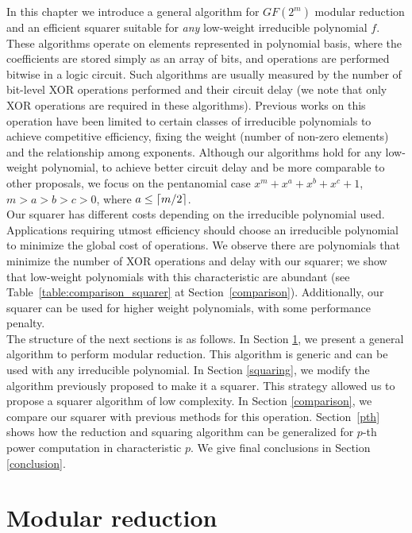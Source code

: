 In this chapter we introduce a general algorithm for $GF(2^m)$ modular reduction and an efficient squarer suitable for \emph{any} low-weight irreducible polynomial $f$. These algorithms operate on elements represented in polynomial basis, where the coefficients are stored simply as an array of bits, and operations are performed bitwise in a logic circuit. Such algorithms are usually measured by the number of bit-level XOR operations performed and their circuit delay (we note that only XOR operations are required in these algorithms). Previous works on this operation have been limited to certain classes of irreducible polynomials to achieve competitive efficiency, fixing the weight (number of non-zero elements) and the relationship among exponents. 
Although our algorithms hold for any low-weight polynomial, to achieve better circuit delay and be more comparable to other proposals, we focus on the pentanomial case $x^m+x^a+x^b+x^c+1$, $m > a > b > c > 0$, where $a \leq \lceil m/2\rceil$.\\

Our squarer has different costs depending on the irreducible polynomial used. Applications requiring utmost efficiency should choose an irreducible polynomial to minimize the global cost of operations. We observe there are polynomials that minimize the number of XOR operations and delay with our squarer; we show that low-weight polynomials with this characteristic are abundant (see Table~\ref{table:comparison_squarer} at Section~\ref{comparison}). Additionally, our squarer can be used for higher weight polynomials, with some performance penalty.\\

The structure of the next sections is as follows. In Section \ref{modrec}, we present a general algorithm to perform modular reduction. This algorithm is generic and can be used with any irreducible polynomial. In Section \ref{squaring}, we modify the algorithm previously proposed to make it a squarer. This strategy allowed us to propose a squarer algorithm of low complexity. In Section \ref{comparison}, we compare our squarer with previous methods for this operation. Section~\ref{pth} shows how the reduction and squaring algorithm can be generalized for $p$-th power computation in characteristic $p$. We give final conclusions in Section \ref{conclusion}. \\

\section{Modular reduction} \label{modrec}

